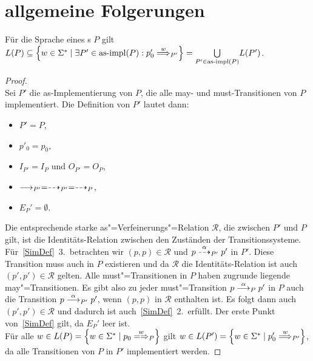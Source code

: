 \chapter{allgemeine Folgerungen}

\begin{Prop}
  \label{LImpProp}
  Für die Sprache eines \MEIO{}s $P$ gilt $L(P) \subseteq \left\{w\in
  \Sigma ^* \mid \exists P'\in\asimp (P) : p'_0\weakmust[w]_{P'} \right\} =
  \underset{P'\in\asimp (P)}{\bigcup} L(P')$.
\end{Prop}
\begin{proof}\mbox{}\\
  Sei $P'$ die as-Implementierung von $P$, die alle may- und must-Transitionen
  von $P$ implementiert. Die Definition von $P'$ lautet dann:
  \begin{itemize}
    \item $P'=P$,
    \item $p'_0=p_0$,
    \item $I_{P'}=I_P$ und $O_{P'}=O_P$,
    \item $\must _{P'} =\may _{P'} = \may _P$,
    \item $E_P'=\emptyset$.
  \end{itemize}
  Die entsprechende starke as"=Verfeinerungs"=Relation $\mathcal{R}$, die
  zwischen $P'$ und $P$ gilt, ist die Identitäts-Relation zwischen den
  Zuständen der Transitionssysteme. Für~\ref{SimDef}~3.\ betrachten wir $(p,p)
  \in\mathcal{R}$ und $p\may[\alpha]_{P'} p'$ in $P'$. Diese Transition muss
  auch in $P$ existieren und da $\mathcal{R}$ die Identitäts-Relation ist auch
  $(p',p')\in\mathcal{R}$ gelten. Alle must"=Transitionen in $P$ haben zugrunde
  liegende may"=Transitionen. Es gibt also zu jeder must"=Transition $p
  \must[\alpha]_P p'$ in $P$ auch die Transition $p\must[\alpha]_{P'} p'$, wenn
  $(p,p)$ in $\mathcal{R}$ enthalten ist. Es folgt dann auch $(p',p') \in
  \mathcal{R}$ und dadurch ist auch~\ref{SimDef}~2.\ erfüllt. Der erste Punkt
  von~\ref{SimDef} gilt, da $E_P'$ leer ist.\\
  Für alle $w\in L(P) = \left\{w\in \Sigma ^* \mid p_0\weakmay[w]_P\right\}$
  gilt $w\in L(P') = \left\{w\in \Sigma ^* \mid p'_0 \weakmust[w]_{P'}
  \right\}$, da alle Transitionen von $P$ in $P'$ implementiert werden.
\end{proof}

